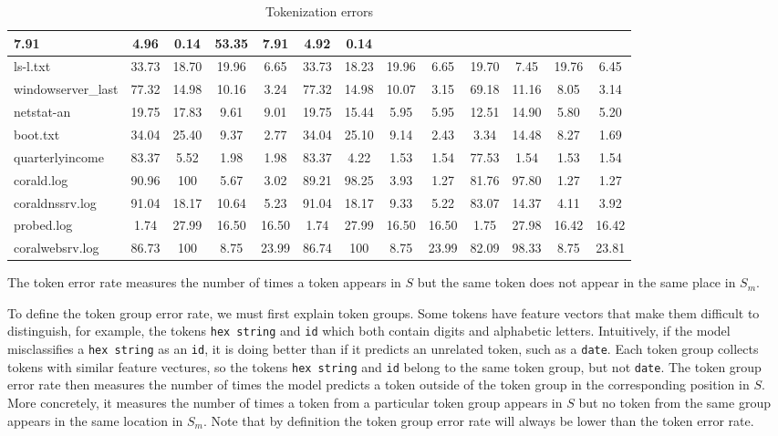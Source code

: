 \begin{table}[th]
\begin{center}
\begin{tabular}{|l||c|c|c|c||c|c|c|c||c|c|c|c|}
7.91
                     & 4.96  & 0.14  & 53.35 & 7.91     & 4.92  & 0.14  \\ \hline
ls-l.txt                   & 33.73 & 18.70 & 19.96 & 6.65  & 33.73 &
               18.23 & 19.96 & 6.65  & 19.70 & 7.45  & 19.76 & 6.45  \\ \hline
windowserver\_last     & 77.32 & 14.98 & 10.16 & 3.24  & 77.32 &
               14.98 & 10.07 & 3.15  & 69.18 & 11.16 & 8.05  & 3.14  \\ \hline
netstat-an                 & 19.75 & 17.83 & 9.61  & 9.01  & 19.75 &
               15.44 & 5.95  & 5.95  & 12.51 & 14.90 & 5.80  & 5.20  \\ \hline
boot.txt                   & 34.04 & 25.40 & 9.37  & 2.77  & 34.04 &
               25.10 & 9.14  & 2.43  & 3.34  & 14.48 & 8.27  & 1.69  \\ \hline
quarterlyincome    & 83.37 & 5.52  & 1.98  & 1.98     & 83.37 &
               4.22  & 1.53  & 1.54     & 77.53 & 1.54  & 1.53  & 1.54     \\ \hline
corald.log            & 90.96 & 100   & 5.67  & 3.02     & 89.21 &
               98.25 & 3.93  & 1.27     & 81.76 & 97.80 & 1.27  & 1.27     \\ \hline
coraldnssrv.log       & 91.04 & 18.17 & 10.64 & 5.23  & 91.04 &
               18.17 & 9.33  & 5.22  & 83.07 & 14.37 & 4.11  & 3.92  \\ \hline
probed.log            & 1.74  & 27.99 & 16.50 & 16.50 & 1.74  &
               27.99 & 16.50 & 16.50 & 1.75  & 27.98 & 16.42 & 16.42 \\ \hline
coralwebsrv.log       & 86.73 & 100   & 8.75  & 23.99 & 86.74 &
               100   & 8.75  & 23.99     & 82.09 & 98.33 & 8.75  & 23.81     \\
               \hline
\end{tabular}
\caption{Tokenization errors}
\label{tab:error}
\end{center}
\end{table}
The token error rate measures the number of times a token appears in
$S$ but the same token does not appear in the same place in $S_m$.

To define the token group error rate, we must first explain token
groups.  Some tokens have feature vectors that make them difficult to
distinguish, for example, the tokens {\tt hex string} and {\tt id}
which both contain digits and alphabetic letters.  Intuitively, if the
model misclassifies a {\tt hex string} as an {\tt id}, it is doing
better than if it predicts an unrelated token, such as a {\tt date}.
Each token group collects tokens with similar feature vectures, so the
tokens {\tt hex string} and {\tt id} belong to the same token group,
but not {\tt date}.  The token group error rate then measures the
number of times the model predicts a token outside of the token group
in the corresponding position in $S$.  More concretely, it measures the number of times a
token from a particular token group appears in $S$ but no token from
the same group appears in the same location in $S_m$.  Note that by
definition the token group error rate will always be lower than the
token error rate. 

